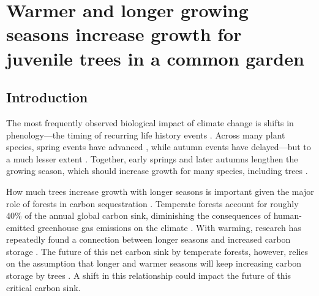 \chapter{Warmer and longer growing seasons increase growth for juvenile trees in a common garden}
\label{ch:Wildchrokie}


\newcommand{\Ainc}{\textit{A. incana}}
\newcommand{\Ball}{\textit{B. alleghaniensis}}
\newcommand{\Bpap}{\textit{B. papyrifera}}
\newcommand{\Bpop}{\textit{B. populifolia}}


\section{Introduction}

The most frequently observed biological impact of climate change is shifts in phenology---the timing of recurring life history events \citep{parmesan_poleward_1999, menzel_european_2006, calvin_ipcc_2023}. Across many plant species, spring events have advanced \citep{wolfe_climate_2005,chmielewski_response_2001,fu_recent_2014}, while autumn events have delayed---but to a much lesser extent \citep{gallinat_autumn_2015,jeong_macroscale_2014}. Together, early springs and later autumns lengthen the growing season, which should increase growth for many species, including trees \citep{keenan_net_2014, stridbeck_partly_2022}. 

How much trees increase growth with longer seasons is important given the major role of forests in carbon sequestration \citep{friedlingstein_global_2026}. Temperate forests account for roughly 40\% of the annual global carbon sink, diminishing the consequences of human-emitted greenhouse gas emissions on the climate \citep{gibbs_revised_2025}. With warming, research has repeatedly found a connection between longer seasons and increased carbon storage \citep{boisvenue_impacts_2006,gaoEarlierStartThermal2022,finziCarbonBudgetHarvard2020}. The future of this net carbon sink by temperate forests, however, relies on the assumption that longer and warmer seasons will keep increasing carbon storage by trees \citep{pan_enduring_2024}. A shift in this relationship could impact the future of this critical carbon sink.

